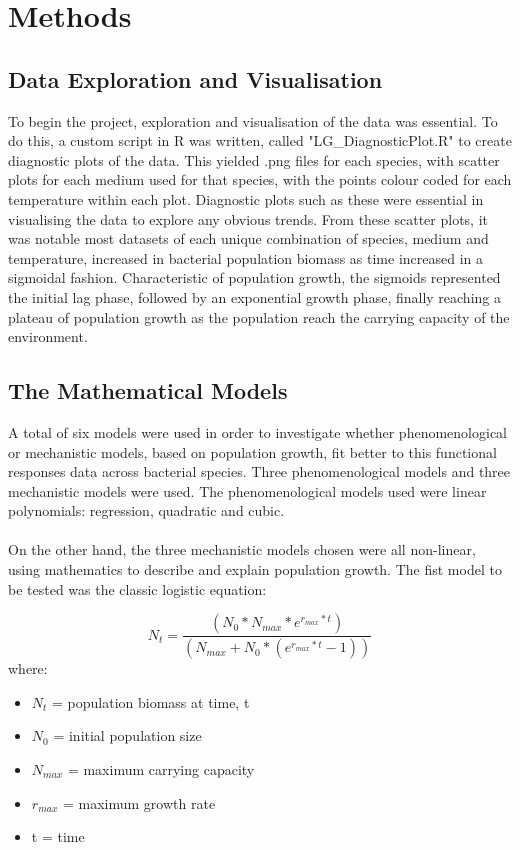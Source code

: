 \documentclass[11pt, a4paper]{article} %
\begin{document}
\section{Methods}

\subsection{Data Exploration and Visualisation}

To begin the project, exploration and visualisation of the data was essential. To do this, a custom script in R was written, called "LG\_DiagnosticPlot.R" to create diagnostic plots of the data. This yielded .png files for each species, with scatter plots for each medium used for that species, with the points colour coded for each temperature within each plot. Diagnostic plots such as these were essential in visualising the data to explore any obvious trends. From these scatter plots, it was notable most datasets of each unique combination of species, medium and temperature, increased in bacterial population biomass as time increased in a sigmoidal fashion. Characteristic of population growth, the sigmoids represented the initial lag phase, followed by an exponential growth phase, finally reaching a plateau of population growth as the population reach the carrying capacity of the environment.

\subsection{The Mathematical Models}

A total of six models were used in order to investigate whether phenomenological or mechanistic models, based on population growth, fit better to this functional responses data across bacterial species. Three phenomenological models and three mechanistic models were used. The phenomenological models used were linear polynomials: regression, quadratic and cubic.
\paragraph{} On the other hand, the three mechanistic models chosen were all non-linear, using mathematics to describe and explain population growth. The fist model to be tested was the classic logistic equation:

\begin{equation}
N_t = \frac{(N_0 * N_{max} * e^{r_{max} * t})} {(N_{max} + N_0 * (e^{r_{max} * t} - 1))}
\label{eqn:logistic}
\end{equation}
where:
\begin{itemize}
\item $N_t$ = population biomass at time, t
\item $N_0$ = initial population size
\item $N_{max}$ = maximum carrying capacity
\item $r_{max}$ = maximum growth rate
\item t = time
\end{itemize}
\end{document}
